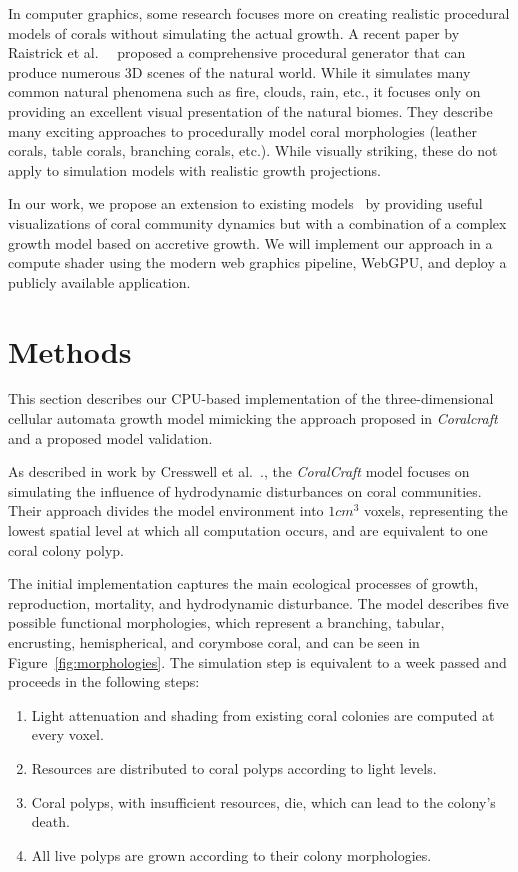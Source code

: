 \documentclass[9pt]{pnas-new}
\renewcommand{\etal}{et al.\ }
\newcommand{\etc}{etc.}
\begin{document}
In computer graphics, some research focuses more on creating realistic procedural models of corals without simulating the actual growth. A recent paper by Raistrick \etal ~\cite{inifinigen} proposed a comprehensive procedural generator that can produce numerous 3D scenes of the natural world. While it simulates many common natural phenomena such as fire, clouds, rain, \etc, it focuses only on providing an excellent visual presentation of the natural biomes. They describe many exciting approaches to procedurally model coral morphologies (leather corals, table corals, branching corals, \etc). While visually striking, these do not apply to simulation models with realistic growth projections.

In our work, we propose an extension to existing models~\cite{coral_community_3D} by providing useful visualizations of coral community dynamics but with a combination of a complex growth model based on accretive growth. We will implement our approach in a compute shader using the modern web graphics pipeline, WebGPU, and deploy a publicly available application.

\section*{Methods}

This section describes our CPU-based implementation of the three-dimensional cellular automata growth model mimicking the approach proposed in \textit{Coralcraft} and a proposed model validation.

As described in work by Cresswell \etal., the \textit{CoralCraft} model focuses on simulating the influence of hydrodynamic disturbances on coral communities. Their approach divides the model environment into $1cm^3$ voxels, representing the lowest spatial level at which all computation occurs, and are equivalent to one coral colony polyp.

The initial implementation captures the main ecological processes of growth, reproduction, mortality, and hydrodynamic disturbance. The model describes five possible functional morphologies, which represent a branching, tabular, encrusting, hemispherical, and corymbose coral, and can be seen in Figure~\ref{fig:morphologies}. The simulation step is equivalent to a week passed and proceeds in the following steps:


\begin{enumerate}
    \item Light attenuation and shading from existing coral colonies are computed at every voxel.
    \item Resources are distributed to coral polyps according to light levels.
    \item Coral polyps, with insufficient resources, die, which can lead to the colony's death.
    \item All live polyps are grown according to their colony morphologies.
\end{enumerate}
\end{document}
